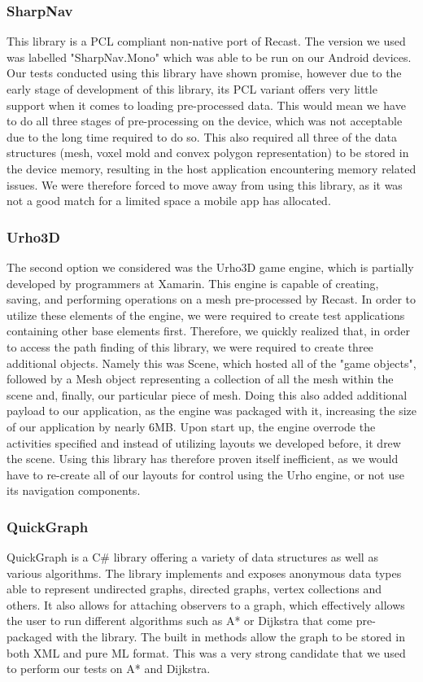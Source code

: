 \documentclass[12pt,a4paper]{report}
\begin{document}
\subsubsection{SharpNav}
This library\cite{libSharpnav} is a PCL compliant non-native port of Recast. The version we used was labelled "SharpNav.Mono" which was able to be run on our Android devices. Our tests conducted using this library have shown promise, however due to the early stage of development of this library, its PCL variant offers very little support when it comes to loading pre-processed data. This would mean we have to do all three stages of pre-processing on the device, which was not acceptable due to the long time required to do so. This also required all three of the data structures (mesh, voxel mold and convex polygon representation) to be stored in the device memory, resulting in the host application encountering memory related issues. We were therefore forced to move away from using this library, as it was not a good match for a limited space a mobile app has allocated.

\subsubsection{Urho3D}
The second option we considered was the Urho3D game engine, which is partially developed by programmers at Xamarin. This engine\cite{libUrho} is capable of creating, saving, and performing operations on a mesh pre-processed by Recast. In order to utilize these elements of the engine, we were required to create test applications containing other base elements first. Therefore, we quickly realized that, in order to access the path finding of this library, we were required to create three additional objects. Namely this was Scene, which hosted all of the "game objects", followed by a Mesh object representing a collection of all the mesh within the scene and, finally, our particular piece of mesh. Doing this also added additional payload to our application, as the engine was packaged with it, increasing the size of our application by nearly 6MB. Upon start up, the engine overrode the activities specified and instead of utilizing layouts we developed before, it drew the scene. Using this library has therefore proven itself inefficient, as we would have to re-create all of our layouts for control using the Urho engine, or not use its navigation components.

\subsubsection{QuickGraph}
QuickGraph\cite{libQuickgraph} is a C\# library offering a variety of data structures as well as various algorithms. The library implements and exposes anonymous data types able to represent undirected graphs, directed graphs, vertex collections and others. It also allows for attaching observers to a graph, which effectively allows the user to run different algorithms such as A* or Dijkstra that come pre-packaged with the library. The built in methods allow the graph to be stored in both XML and pure ML format. This was a very strong candidate that we used to perform our tests on A* and Dijkstra.
\end{document}
